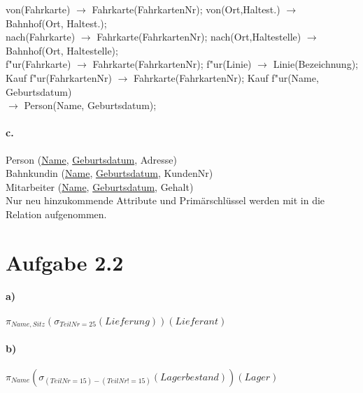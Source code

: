 \documentclass[12pt]{article}
\newcommand{\arrowright}{$\longrightarrow$ }
\begin{document}
 	von(Fahrkarte) \arrowright Fahrkarte(FahrkartenNr); von(Ort,Haltest.) \arrowright Bahnhof(Ort, Haltest.);\\[1.1em]
 	
 	nach(Fahrkarte) \arrowright Fahrkarte(FahrkartenNr); nach(Ort,Haltestelle) \arrowright Bahnhof(Ort, Haltestelle);\\[1.1em]
 	
 	f"ur(Fahrkarte) \arrowright Fahrkarte(FahrkartenNr); f"ur(Linie) \arrowright Linie(Bezeichnung);\\[1.1em]
 	
 	Kauf f"ur(FahrkartenNr) \arrowright Fahrkarte(FahrkartenNr); Kauf f"ur(Name, Geburtsdatum)\\ \arrowright Person(Name, Geburtsdatum);\\[1.1em]
 	
 	\paragraph*{c.}
 	Person (\underline{Name}, \underline{Geburtsdatum}, Adresse) \\[1,3em]
 	
 	Bahnkundin (\underline{Name}, \underline{Geburtsdatum}, KundenNr) \\[1,3em]
 	
 	Mitarbeiter (\underline{Name}, \underline{Geburtsdatum}, Gehalt) \\[1,3em]
 	Nur neu hinzukommende Attribute und Primärschlüssel werden mit in die Relation aufgenommen.
 		
 	\section*{Aufgabe 2.2}
 	
 	\paragraph*{a)}
 	$\pi_{Name, Sitz}(\sigma_{TeilNr=25}(Lieferung))(Lieferant)$
 	
 	\paragraph*{b)}
 	$\pi_{Name}(\sigma_{(TeilNr=15) - (TeilNr != 15)}(Lagerbestand))(Lager)$
 	
\end{document}
